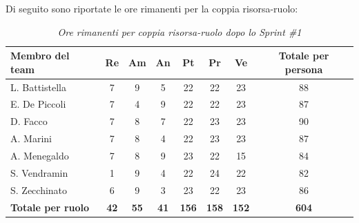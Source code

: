 \documentclass[a4paper, 10pt, colorlinks=true, linkcolor=black, urlcolor=blue, citecolor=blue, hidelinks]{article}
\renewcommand{\arraystretch}{1.2}
\begin{document}
Di seguito sono riportate le ore rimanenti per la coppia risorsa-ruolo:
\begin{table}[H]
    \centering
    \renewcommand{\arraystretch}{1.4}
    \begin{tabular}{|l|c|c|c|c|c|c|c|}
        \hline
        \rowcolor{bluBitless!15}
        \textbf{Membro del team} & \textbf{Re} & \textbf{Am} & \textbf{An} & \textbf{Pt} & \textbf{Pr} & \textbf{Ve} & \textbf{Totale per persona} \\
        \hline
        L. Battistella & 7 & 9 & 5 & 22 & 22 & 23 & 88 \\ \hline
        E. De Piccoli & 7 & 4 & 9 & 22 & 22 & 23 & 87 \\ \hline
        D. Facco & 7 & 8 & 7 & 22 & 23 & 23 & 90 \\ \hline
        A. Marini & 7 & 8 & 4 & 22 & 23 & 23 & 87 \\ \hline
        A. Menegaldo & 7 & 8 & 9 & 23 & 22 & 15 & 84 \\ \hline
        S. Vendramin & 1 & 9 & 4 & 22 & 24 & 22 & 82 \\ \hline
        S. Zecchinato & 6 & 9 & 3 & 23 & 22 & 23 & 86 \\ \hline
        \rowcolor{bluBitless!8}
        \textbf{Totale per ruolo} & \textbf{42} & \textbf{55} & \textbf{41} & \textbf{156} & \textbf{158} & \textbf{152} & \textbf{604} \\
        \hline
    \end{tabular}
    \caption{\textit{Ore rimanenti per coppia risorsa-ruolo dopo lo Sprint \#1}}
\end{table}
\end{document}
